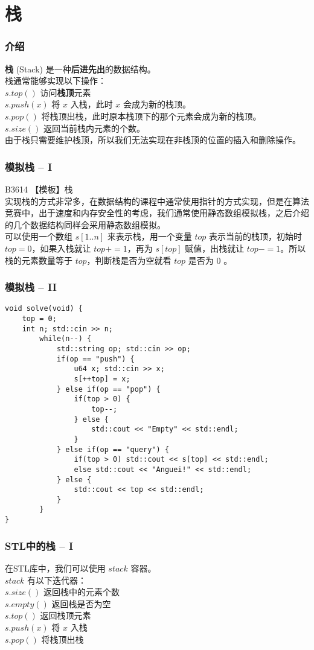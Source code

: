 \documentclass{beamer}
\newcommand{\fdf}[1]{\alert{\textbf{#1}}}
\begin{document}
\section{栈}
\begin{frame}
\frametitle{介绍}
\fdf{栈} (Stack) 是一种\fdf{后进先出}的数据结构。\\ 
栈通常能够实现以下操作：\\ 
$s.top()$ 访问\fdf{栈顶}元素\\
$s.push(x)$ 将 $x$ 入栈，此时 $x$ 会成为新的栈顶。\\ 
$s.pop()$ 将栈顶出栈，此时原本栈顶下的那个元素会成为新的栈顶。\\ 
$s.size()$ 返回当前栈内元素的个数。 \\ 
由于栈只需要维护栈顶，所以我们无法实现在非栈顶的位置的插入和删除操作。
\end{frame}
\begin{frame}
\frametitle{模拟栈 -- I}
B3614 【模板】栈\\
实现栈的方式非常多，在数据结构的课程中通常使用指针的方式实现，但是在算法竞赛中，出于速度和内存安全性的考虑，我们通常使用静态数组模拟栈，之后介绍的几个数据结构同样会采用静态数组模拟。 \\ 
可以使用一个数组 $s[1..n]$ 来表示栈，用一个变量 $top$ 表示当前的栈顶，初始时 $top = 0$，如果入栈就让 $top += 1$，再为 $s[top]$ 赋值，出栈就让 $top -= 1$。所以栈的元素数量等于 $top$，判断栈是否为空就看 $top$ 是否为 $0$ 。
\end{frame}
\begin{frame}[fragile]
\frametitle{模拟栈 -- II}
\begin{onlyenv}
\begin{verbatim}
void solve(void) {
    top = 0;
    int n; std::cin >> n;
        while(n--) {
            std::string op; std::cin >> op;
            if(op == "push") {
                u64 x; std::cin >> x;
                s[++top] = x;
            } else if(op == "pop") {
                if(top > 0) {
                    top--;
                } else {
                    std::cout << "Empty" << std::endl;
                }
            } else if(op == "query") {
                if(top > 0) std::cout << s[top] << std::endl;
                else std::cout << "Anguei!" << std::endl;
            } else {
                std::cout << top << std::endl;
            }
        }
}
\end{verbatim}
\end{onlyenv}
\end{frame}
\begin{frame}[fragile]
\frametitle{STL中的栈 -- I}
在STL库中，我们可以使用 $stack$ 容器。\\
$stack$ 有以下迭代器： \\ 
$s.size()$ 返回栈中的元素个数 \\
$s.empty()$ 返回栈是否为空 \\
$s.top()$ 返回栈顶元素 \\
$s.push(x)$ 将 $x$ 入栈 \\
$s.pop()$ 将栈顶出栈
\end{frame}
\end{document}
